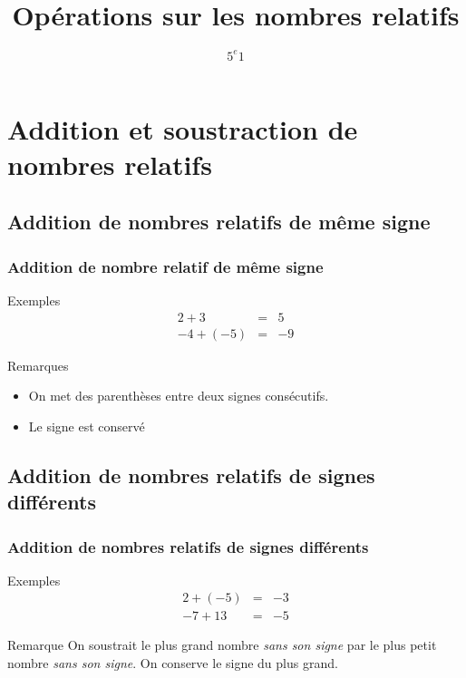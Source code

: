 \documentclass{beamer}
\title{Opérations sur les nombres relatifs}
\author{$5^{e}1$}
\begin{document}
\frame{\titlepage}

\section{Addition et soustraction de nombres relatifs}

\subsection{Addition de nombres relatifs de même signe}

\begin{frame}
  \frametitle{Addition de nombre relatif de même signe}
  \begin{exampleblock}{Exemples}	
    \begin{eqnarray*}
      2 + 3 &=& 5\\
      -4 + (-5) &=& -9
    \end{eqnarray*}
  \end{exampleblock}

  \begin{block}{Remarques}
    \begin{itemize}
    \item On met des parenthèses entre deux signes consécutifs.
    \item Le signe est conservé
    \end{itemize}
  \end{block}
\end{frame}

\subsection{Addition de nombres relatifs de signes différents}

\begin{frame}
  \frametitle{Addition de nombres relatifs de signes différents}
  \begin{exampleblock}{Exemples}	
    \begin{eqnarray*}
      2 + (-5) &=& -3\\
      -7 + 13 &=& -5
    \end{eqnarray*}
  \end{exampleblock}

  \begin{block}{Remarque}
    On soustrait le plus grand nombre \textit{sans son signe} par le plus petit nombre \textit{sans son signe}. On conserve le signe du plus grand.
  \end{block}
\end{frame}
\end{document}
